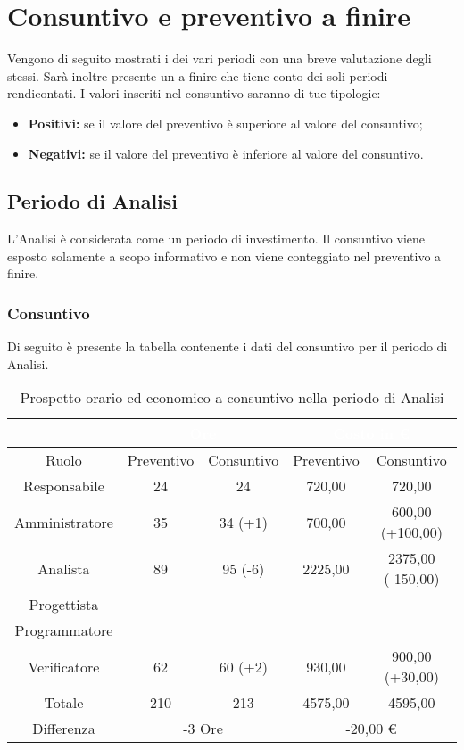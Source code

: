 \section{Consuntivo e preventivo a finire}
\label{consuntivo_preventivo_a_finire}
Vengono di seguito mostrati i  dei vari periodi con una breve valutazione degli stessi. Sarà inoltre presente un  a finire che tiene conto dei soli periodi rendicontati. I valori inseriti nel consuntivo saranno di tue tipologie:
\begin {itemize}
	\item \textbf{Positivi:} se il valore del preventivo è superiore al valore del consuntivo;
	\item \textbf{Negativi:} se il valore del preventivo è inferiore al valore del consuntivo.
\end{itemize}
\subsection{Periodo di Analisi}
L'Analisi è considerata come un periodo di investimento. Il consuntivo viene esposto solamente a scopo informativo e non viene conteggiato nel preventivo a finire.
\subsubsection{Consuntivo}
Di seguito è presente la tabella contenente i dati del consuntivo per il periodo di Analisi.
\begin{table}[H]
	\centering
	\begin{tabular}{|c|c|c|c|c|}
	\rowcolor{darkblue} 
	 	 			&	\multicolumn{2}{c|}{\textcolor{white}{Ore}} 		& 	\multicolumn{2}{c|}{\textcolor{white}{Costo in €}}  \\ \hline
			Ruolo		&	Preventivo	&	Consuntivo	&	Preventivo	&	Consuntivo 	\\ \hline
		Responsabile		&	24		&	24		&	720,00	&	720,00  	\\ \hline
		Amministratore	&	35		&	34 (+1)	&	700,00	&	600,00 (+100,00)  \\ \hline
		Analista		&	89		&	95 (-6)	&	2225,00	&	2375,00 (-150,00)  \\ \hline
		Progettista		& 			&	 		& 			&  			\\ \hline
		Programmatore	& 			& 			& 			&  			\\ \hline
		Verificatore		&	62		&	60 (+2)	&	930,00	&	900,00 (+30,00) 	\\ \hline
		Totale			&	210		&	213		&	4575,00	&	4595,00  	\\ \hline
		Differenza		& 	\multicolumn{2}{c|}{-3 Ore} 	& 	\multicolumn{2}{c|}{-20,00 €} 	\\ \hline
	\end{tabular}
	\caption{Prospetto orario ed economico a consuntivo nella periodo di Analisi}
\end{table}
